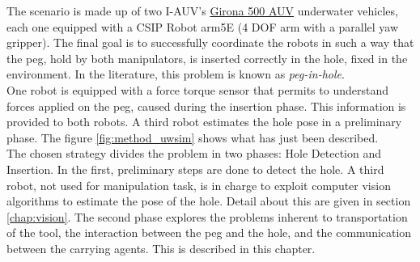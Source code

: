The scenario is made up of two I-AUV's \href{https://cirs.udg.edu/auvs-technology/auvs/girona-500-auv/}{Girona 500 AUV} underwater vehicles, each one equipped with a CSIP Robot arm5E (4 DOF arm with a parallel yaw gripper). The final goal is to successfully coordinate the robots in such a way that the peg, hold by both manipulators, is inserted correctly in the hole, fixed in the environment. In the literature, this problem is known as \textit{peg-in-hole}.\\
One robot is equipped with a force torque sensor that permits to understand forces applied on the peg, caused during the insertion phase. This information is provided to both robots. A third robot estimates the hole pose in a preliminary phase. The figure \ref{fig:method_uwsim} shows what has just been described.\\
The chosen strategy divides the problem in two phases: Hole Detection and Insertion. In the first, preliminary steps are done to detect the hole. A third robot, not used for manipulation task, is in charge to exploit computer vision algorithms to estimate the pose of the hole. Detail about this are given in section \ref{chap:vision}.
The second phase explores the problems inherent to transportation of the tool, the interaction between the peg and the hole, and the communication between the carrying agents. This is described in this chapter.

